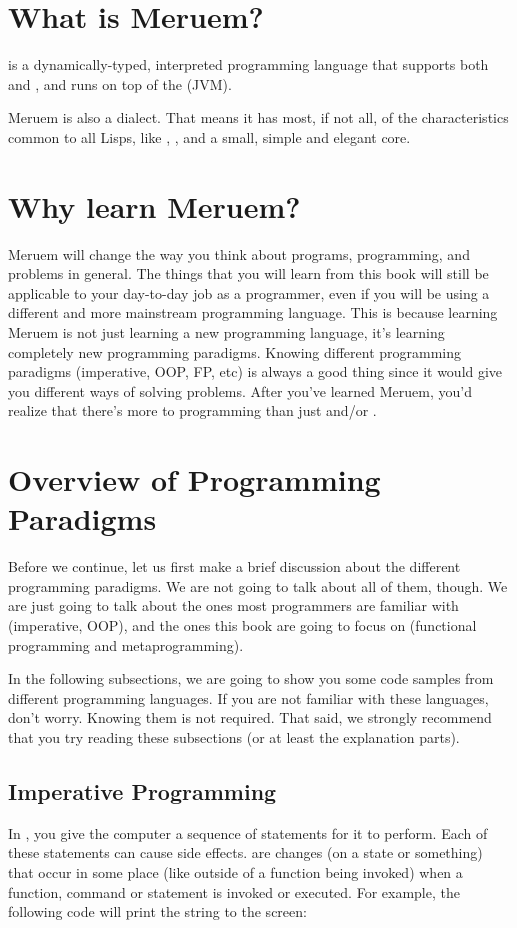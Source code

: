 \section{What is Meruem?}
 is a dynamically-typed, interpreted programming language that supports both  and , and runs on top of the  (JVM).

Meruem is also a  dialect. That means it has most, if not all, of the characteristics common to all Lisps, like , , and a small, simple and elegant core.

\section{Why learn Meruem?}
Meruem will change the way you think about programs, programming, and problems in general. The things that you will learn from this book will still be applicable to your day-to-day job as a programmer, even if you will be using a different and more mainstream programming language. This is because learning Meruem is not just learning a new programming language, it's learning completely new programming paradigms. Knowing different programming paradigms (imperative, OOP, FP, etc) is always a good thing since it would give you different ways of solving problems. After you've learned Meruem, you'd realize that there's more to programming than just  and/or .

\section{Overview of Programming Paradigms}
Before we continue, let us first make a brief discussion about the different programming paradigms. We are not going to talk about all of them, though. We are just going to talk about the ones most programmers are familiar with (imperative, OOP), and the ones this book are going to focus on (functional programming and metaprogramming).

In the following subsections, we are going to show you some code samples from different programming languages. If you are not familiar with these languages, don't worry. Knowing them is not required. That said, we strongly recommend that you try reading these subsections (or at least the explanation parts).

\subsection{Imperative Programming}
In , you give the computer a sequence of statements for it to perform. Each of these statements can cause side effects.  are changes (on a state or something) that occur in some place (like outside of a function being invoked) when a function, command or statement is invoked or executed. For example, the following code will print the string  to the screen:

